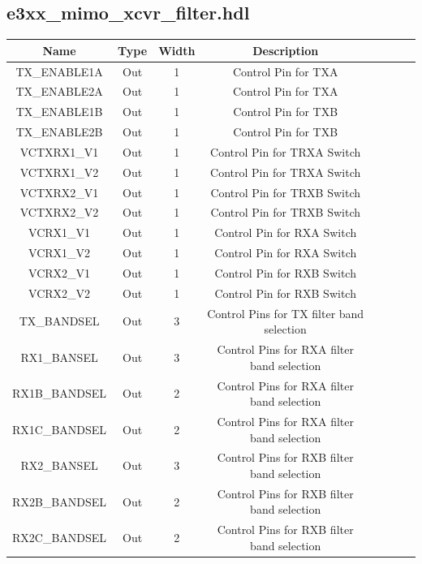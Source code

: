 \documentclass{article}
\def\comp{e3xx\_mimo\_xcvr\_filter}
\begin{document}
\begin{landscape}
\subsection*{\comp.hdl}
		\begin{scriptsize}
			\begin{tabular}{|c|c|c|c|p{2.6cm}|c|c|c|}
			\hline
			\rowcolor{blue}
			Name & Type  & Width & Description \\
			\hline
			TX\_ENABLE1A  & Out & 1     & Control Pin for TXA    \\
			\hline
			TX\_ENABLE2A  & Out & 1     & Control Pin for TXA    \\
			\hline
			TX\_ENABLE1B  & Out & 1     & Control Pin for TXB    \\
			\hline
			TX\_ENABLE2B  & Out & 1     & Control Pin for TXB    \\
			\hline
			VCTXRX1\_V1   & Out & 1     & Control Pin for TRXA Switch   \\
			\hline
			VCTXRX1\_V2   & Out & 1     & Control Pin for TRXA Switch   \\
			\hline
			VCTXRX2\_V1   & Out & 1     & Control Pin for TRXB Switch   \\
			\hline
			VCTXRX2\_V2   & Out & 1     & Control Pin for TRXB Switch   \\
			\hline
			VCRX1\_V1   & Out & 1     & Control Pin for RXA Switch   \\
			\hline
			VCRX1\_V2   & Out & 1     & Control Pin for RXA Switch   \\
			\hline
			VCRX2\_V1   & Out & 1     & Control Pin for RXB Switch   \\
			\hline
			VCRX2\_V2   & Out & 1     & Control Pin for RXB Switch   \\
			\hline
			TX\_BANDSEL   & Out & 3     & Control Pins for TX filter band selection   \\
			\hline
			RX1\_BANSEL     & Out & 3     & Control Pins for RXA filter band selection   \\
			\hline
			RX1B\_BANDSEL   & Out & 2     & Control Pins for RXA filter band selection   \\
			\hline
			RX1C\_BANDSEL   & Out & 2     & Control Pins for RXA filter band selection   \\
			\hline
			RX2\_BANSEL     & Out & 3     & Control Pins for RXB filter band selection   \\
			\hline
			RX2B\_BANDSEL   & Out & 2     & Control Pins for RXB filter band selection   \\
			\hline
			RX2C\_BANDSEL   & Out & 2     & Control Pins for RXB filter band selection   \\

\end{tabular}
\end{scriptsize}
\end{landscape}
\end{document}
